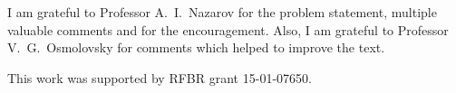 \vskip 40pt

I am grateful to Professor A.~I.~Nazarov for the problem statement, multiple valuable comments and for the encouragement.
Also, I am grateful to Professor V.~G.~Osmolovsky for comments which helped to improve the text.

This work was supported by RFBR grant 15-01-07650.